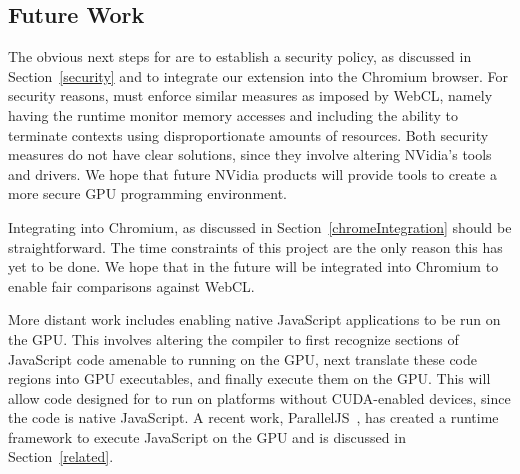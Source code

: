 \subsection{Future Work}
\label{future}
The obvious next steps for \name are to establish a security policy, as
discussed in Section~\ref{security} and to integrate our extension into the
Chromium browser. For security reasons, \name must enforce similar measures as
imposed by WebCL, namely having the runtime monitor memory accesses and
including the ability to terminate contexts using disproportionate amounts of
resources. Both security measures do not have clear solutions, since they involve
altering NVidia's tools and drivers. We hope that future NVidia products will
provide tools to create a more secure GPU programming environment.

Integrating \name into Chromium, as discussed in Section~\ref{chromeIntegration} should be
straightforward. The time constraints of this project are the only reason this
has yet to be done. We hope that in the future \name will be integrated into
Chromium to enable fair comparisons against WebCL.


More distant work includes enabling native JavaScript applications to be run on
the GPU. This involves altering the compiler to first recognize sections of JavaScript
code amenable to running on the GPU, next translate these code regions into GPU
executables, and finally execute them on the GPU. This will allow code
designed for \name to run on platforms without CUDA-enabled devices, since the
code is native JavaScript.  A recent work, ParallelJS~\cite{parallelJS}, has
created a runtime framework to execute JavaScript on the GPU and is discussed in
Section~\ref{related}.


